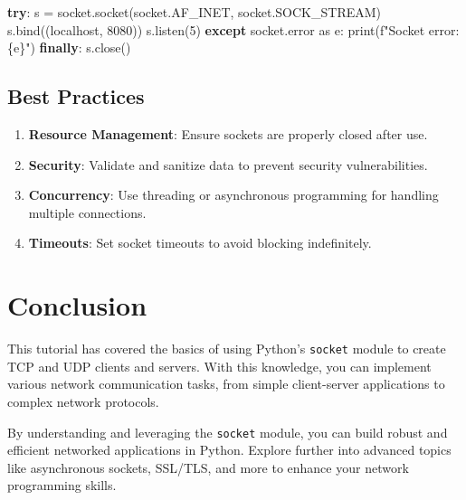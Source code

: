 \documentclass[
  letterpaper,
  DIV=11,
  numbers=noendperiod]{scrreprt}
\newenvironment{Shaded}{\begin{snugshade}}{\end{snugshade}}
\newcommand{\BuiltInTok}[1]{\textcolor[rgb]{0.00,0.23,0.31}{#1}}
\newcommand{\ControlFlowTok}[1]{\textcolor[rgb]{0.00,0.23,0.31}{\textbf{#1}}}
\newcommand{\DecValTok}[1]{\textcolor[rgb]{0.68,0.00,0.00}{#1}}
\newcommand{\ImportTok}[1]{\textcolor[rgb]{0.00,0.46,0.62}{#1}}
\newcommand{\NormalTok}[1]{\textcolor[rgb]{0.00,0.23,0.31}{#1}}
\newcommand{\OperatorTok}[1]{\textcolor[rgb]{0.37,0.37,0.37}{#1}}
\newcommand{\SpecialCharTok}[1]{\textcolor[rgb]{0.37,0.37,0.37}{#1}}
\newcommand{\SpecialStringTok}[1]{\textcolor[rgb]{0.13,0.47,0.30}{#1}}
\newcommand{\StringTok}[1]{\textcolor[rgb]{0.13,0.47,0.30}{#1}}
\providecommand{\tightlist}{%
  \setlength{\itemsep}{0pt}\setlength{\parskip}{0pt}}\usepackage{longtable,booktabs,array}
\begin{document}
\begin{Shaded}
\begin{Highlighting}[]
\ControlFlowTok{try}\NormalTok{:}
\NormalTok{    s }\OperatorTok{=}\NormalTok{ socket.socket(socket.AF\_INET, socket.SOCK\_STREAM)}
\NormalTok{    s.bind((}\StringTok{\textquotesingle{}localhost\textquotesingle{}}\NormalTok{, }\DecValTok{8080}\NormalTok{))}
\NormalTok{    s.listen(}\DecValTok{5}\NormalTok{)}
\ControlFlowTok{except}\NormalTok{ socket.error }\ImportTok{as}\NormalTok{ e:}
    \BuiltInTok{print}\NormalTok{(}\SpecialStringTok{f"Socket error: }\SpecialCharTok{\{}\NormalTok{e}\SpecialCharTok{\}}\SpecialStringTok{"}\NormalTok{)}
\ControlFlowTok{finally}\NormalTok{:}
\NormalTok{    s.close()}
\end{Highlighting}
\end{Shaded}

\subsection{Best Practices}\label{best-practices-10}

\begin{enumerate}
\def\labelenumi{\arabic{enumi}.}
\tightlist
\item
  \textbf{Resource Management}: Ensure sockets are properly closed after
  use.
\item
  \textbf{Security}: Validate and sanitize data to prevent security
  vulnerabilities.
\item
  \textbf{Concurrency}: Use threading or asynchronous programming for
  handling multiple connections.
\item
  \textbf{Timeouts}: Set socket timeouts to avoid blocking indefinitely.
\end{enumerate}

\section{Conclusion}\label{conclusion-45}

This tutorial has covered the basics of using Python's \texttt{socket}
module to create TCP and UDP clients and servers. With this knowledge,
you can implement various network communication tasks, from simple
client-server applications to complex network protocols.

By understanding and leveraging the \texttt{socket} module, you can
build robust and efficient networked applications in Python. Explore
further into advanced topics like asynchronous sockets, SSL/TLS, and
more to enhance your network programming skills.
\end{document}
